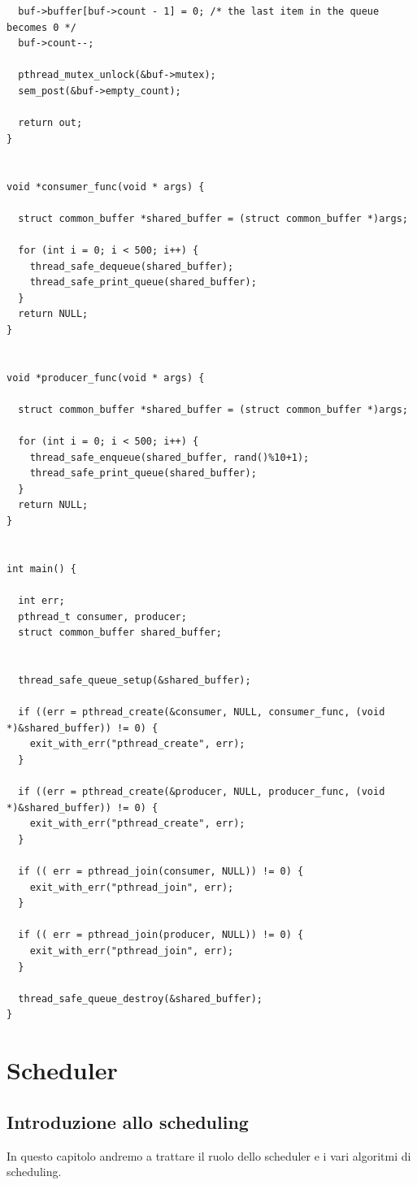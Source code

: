 \documentclass{report}
\begin{document}
\begin{small}
\begin{verbatim}
  buf->buffer[buf->count - 1] = 0; /* the last item in the queue becomes 0 */
  buf->count--;
  
  pthread_mutex_unlock(&buf->mutex);
  sem_post(&buf->empty_count);
  
  return out;
}


void *consumer_func(void * args) {
  
  struct common_buffer *shared_buffer = (struct common_buffer *)args;
  
  for (int i = 0; i < 500; i++) {
    thread_safe_dequeue(shared_buffer);
    thread_safe_print_queue(shared_buffer);
  }
  return NULL;
}


void *producer_func(void * args) {
  
  struct common_buffer *shared_buffer = (struct common_buffer *)args;
  
  for (int i = 0; i < 500; i++) {
    thread_safe_enqueue(shared_buffer, rand()%10+1);
    thread_safe_print_queue(shared_buffer);
  }
  return NULL;
}


int main() {
  
  int err;
  pthread_t consumer, producer;
  struct common_buffer shared_buffer;
  
  
  thread_safe_queue_setup(&shared_buffer);
  
  if ((err = pthread_create(&consumer, NULL, consumer_func, (void *)&shared_buffer)) != 0) {
    exit_with_err("pthread_create", err);
  }
  
  if ((err = pthread_create(&producer, NULL, producer_func, (void *)&shared_buffer)) != 0) {
    exit_with_err("pthread_create", err);
  }
  
  if (( err = pthread_join(consumer, NULL)) != 0) {
    exit_with_err("pthread_join", err);
  }
  
  if (( err = pthread_join(producer, NULL)) != 0) {
    exit_with_err("pthread_join", err);
  }
  
  thread_safe_queue_destroy(&shared_buffer);
}

\end{verbatim}
\end{small}
\chapter{Scheduler}

\section{Introduzione allo scheduling}
In questo capitolo andremo a trattare il ruolo dello scheduler e i vari algoritmi di scheduling.
\end{document}

